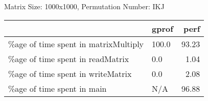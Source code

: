 \documentclass{article}
\begin{document}
    Matrix Size: 1000x1000, Permutation Number: IKJ \\
    \begin{tabular}{llr}
\hline
                                      & gprof   &   perf \\
\hline
 \%age of time spent in matrixMultiply & 100.0   &  93.23 \\
 \%age of time spent in readMatrix     & 0.0     &   1.04 \\
 \%age of time spent in writeMatrix    & 0.0     &   2.08 \\
 \%age of time spent in main           & N/A     &  96.88 \\
\hline
\end{tabular}
    
\end{document}
